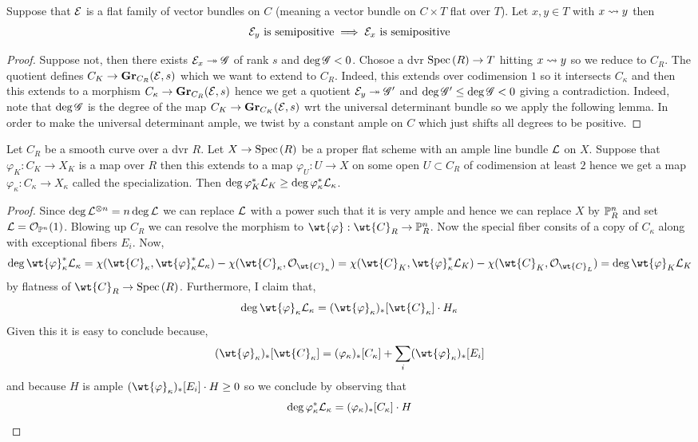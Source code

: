 \documentclass[12pt]{article}
\begin{document}
\begin{lemma}
Suppose that $\E$ is a flat family of vector bundles on $C$ (meaning a vector bundle on $C \times T$ flat over $T$). Let $x, y \in T$ with $x \spto y$ then
\[ \E_y \text{ is semipositive} \implies \E_x \text{ is semipositive} \]
\end{lemma}

\begin{proof}
Suppose not, then there exists $\E_x \onto \G$ of rank $s$ and $\deg{\G} < 0$. Chosoe a dvr $\Spec{R} \to T$ hitting $x \spto y$ so we reduce to $C_R$. The quotient defines $C_K \to \Gr_{C_R}(\E, s)$ which we want to extend to $C_R$. Indeed, this extends over codimension $1$ so it intersects $C_\kappa$ and then this extends to a morphism $C_\kappa \to \Gr_{C_R}(\E, s)$ hence we get a quotient $\E_y \onto \G'$ and $\deg{\G'} \le \deg{\G} < 0$ giving a contradiction. Indeed, note that $\deg{\G}$ is the degree of the map $C_K \to \Gr_{C_K}(\E, s)$ wrt the universal determinant bundle so we apply the following lemma. In order to make the universal determinant ample, we twist by a constant ample on $C$ which just shifts all degrees to be positive.
\end{proof}

\begin{lemma}
Let $C_R$ be a smooth curve over a dvr $R$. Let $X \to \Spec{R}$ be a proper flat scheme with an ample line bundle $\L$ on $X$. Suppose that $\varphi_K : C_K \to X_K$ is a map over $R$ then this extends to a map $\varphi_U  : U \to X$ on some open $U \subset C_R$ of codimension at least $2$ hence we get a map $\varphi_\kappa : C_\kappa \to X_\kappa$ called the specialization. Then $\deg{\varphi_K^* \L_K} \ge \deg{\varphi_\kappa^* \L_\kappa}$.
\end{lemma}

\begin{proof}
Since $\deg{\L^{\ot n}} = n \deg{\L}$ we can replace $\L$ with a power such that it is very ample and hence we can replace $X$ by $\P^n_R$ and set $\L = \struct{\P^n}(1)$. Blowing up $C_R$ we can resolve the morphism to $\wt{\varphi} : \wt{C}_R \to \P_R^n$. Now the special fiber consits of a copy of $C_\kappa$ along with exceptional fibers $E_i$. Now,
\[ \deg{\wt{\varphi}_\kappa^* \L_\kappa} = \chi(\wt{C}_\kappa, \wt{\varphi}_\kappa^* \L_\kappa) - \chi(\wt{C}_\kappa, \struct{\wt{C}_\kappa}) = \chi(\wt{C}_K, \wt{\varphi}_\kappa^* \L_K) - \chi(\wt{C}_K, \struct{\wt{C}_L}) = \deg{\wt{\varphi}_K \L_K} \]
by flatness of $\wt{C}_R \to \Spec{R}$. Furthermore, I claim that,
\[ \deg{\wt{\varphi}_\kappa \L_\kappa} = (\wt{\varphi}_\kappa)_* [\wt{C}_\kappa] \cdot H_\kappa \]
Given this it is easy to conclude because,
\[ (\wt{\varphi}_\kappa)_* [\wt{C}_\kappa] = (\varphi_\kappa)_* [C_\kappa] + \sum_i (\wt{\varphi}_\kappa)_* [E_i] \]
and because $H$ is ample $(\wt{\varphi}_\kappa)_* [E_i] \cdot H \ge 0$ so we conclude by observing that 
\[ \deg{\varphi_\kappa^* \L_\kappa} = (\varphi_\kappa)_* [C_\kappa] \cdot H \] 
\end{proof}
\end{document}
